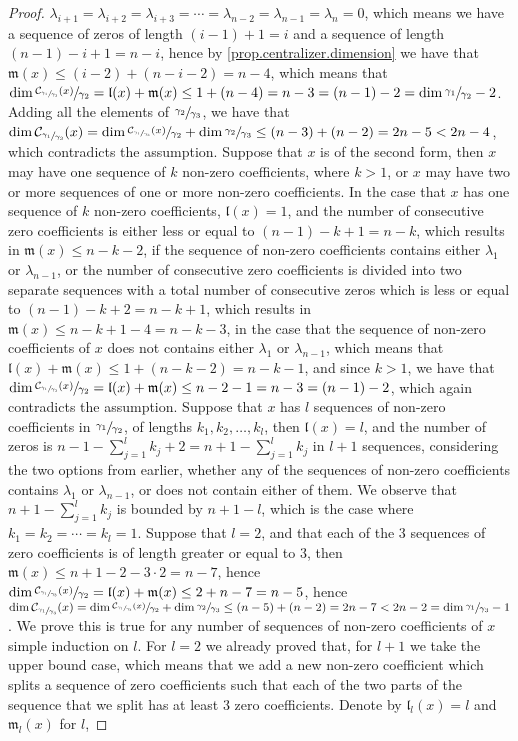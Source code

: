 \documentclass[12pt,fleqn]{article}
\begin{document}
\begin{proof}
$\lambda_{i+1}=\lambda_{i+2}=\lambda_{i+3}=\cdots=\lambda_{n-2}=\lambda_{n-1}=\lambda_n=0$, which means we have a sequence of zeros of length $(i-1)+1=i$ and a sequence of length $(n-1)-i+1=n-i$, hence by \ref{prop.centralizer.dimension} we have that $\mathfrak{m}(x)\leq(i-2)+(n-i-2)=n-4$, which means that $\dim\sfrac{\mathcal{C}_{\sfrac{\gamma_1}{\gamma_3}}(x)}{\gamma_2}=\mathfrak{l}(x)+\mathfrak{m}(x)\leq 1+(n-4)=n-3=(n-1)-2=\dim\sfrac{\gamma_1}{\gamma_2}-2$. Adding all the elements of $\sfrac{\gamma_2}{\gamma_3}$, we have that $\dim\mathcal{C}_{\sfrac{\gamma_1}{\gamma_3}}(x)=\dim\sfrac{\mathcal{C}_{\sfrac{\gamma_1}{\gamma_3}}(x)}{\gamma_2}+\dim\sfrac{\gamma_2}{\gamma_3}\leq(n-3)+(n-2)=2n-5<2n-4$, which contradicts the assumption. Suppose that $x$ is of the second form, then $x$ may have one sequence of $k$ non-zero coefficients, where $k>1$, or $x$ may have two or more sequences of one or more non-zero coefficients. In the case that $x$ has one sequence of $k$ non-zero coefficients, $\mathfrak{l}(x)=1$, and the number of consecutive zero coefficients is either less or equal to $(n-1)-k+1=n-k$, which results in $\mathfrak{m}(x)\leq n-k-2$, if the sequence of non-zero coefficients contains either $\lambda_1$ or $\lambda_{n-1}$, or the number of consecutive zero coefficients is divided into two separate sequences with a total number of consecutive zeros which is less or equal to $(n-1)-k+2=n-k+1$, which results in $\mathfrak{m}(x)\leq n-k+1-4=n-k-3$, in the case that the sequence of non-zero coefficients of $x$ does not contains either $\lambda_1$ or $\lambda_{n-1}$, which means that $\mathfrak{l}(x)+\mathfrak{m}(x)\leq 1+(n-k-2)=n-k-1$, and since $k>1$, we have that $\dim\sfrac{\mathcal{C}_{\sfrac{\gamma_1}{\gamma_3}}(x)}{\gamma_2}=\mathfrak{l}(x)+\mathfrak{m}(x)\leq n-2-1=n-3=(n-1)-2$, which again contradicts the assumption. Suppose that $x$ has $l$ sequences of non-zero coefficients in $\sfrac{\gamma_1}{\gamma_2}$, of lengths $k_1,k_2,\dots,k_l$, then $\mathfrak{l}(x)=l$, and the number of zeros is $n-1-\sum_{j=1}^l k_j+2=n+1-\sum_{j=1}^l k_j$ in $l+1$ sequences, considering the two options from earlier, whether any of the sequences of non-zero coefficients contains $\lambda_1$ or $\lambda_{n-1}$, or does not contain either of them. We observe that $n+1-\sum_{j=1}^l k_j$ is bounded by $n+1-l$, which is the case where $k_1=k_2=\cdots=k_l=1$. Suppose that $l=2$, and that each of the $3$ sequences of zero coefficients is of length greater or equal to $3$, then $\mathfrak{m}(x)\leq n+1-2-3\cdot 2=n-7$, hence $\dim\sfrac{\mathcal{C}_{\sfrac{\gamma_1}{\gamma_3}}(x)}{\gamma_2}=\mathfrak{l}(x)+\mathfrak{m}(x)\leq 2+n-7=n-5$, hence $\dim\mathcal{C}_{\sfrac{\gamma_1}{\gamma_3}}(x)=\dim\sfrac{\mathcal{C}_{\sfrac{\gamma_1}{\gamma_3}}(x)}{\gamma_2}+\dim\sfrac{\gamma_2}{\gamma_3}\leq (n-5)+(n-2)=2n-7<2n-2=\dim\sfrac{\gamma_1}{\gamma_3}-1$. We prove this is true for any number of sequences of non-zero coefficients of $x$ simple induction on $l$. For $l=2$ we already proved that, for $l+1$ we take the upper bound case, which means that we add a new non-zero coefficient which splits a sequence of zero coefficients such that each of the two parts of the sequence that we split has at least $3$ zero coefficients. Denote by $\mathfrak{l}_l(x)=l$ and $\mathfrak{m}_l(x)$ for $l$, 
\end{proof}
\end{document}
